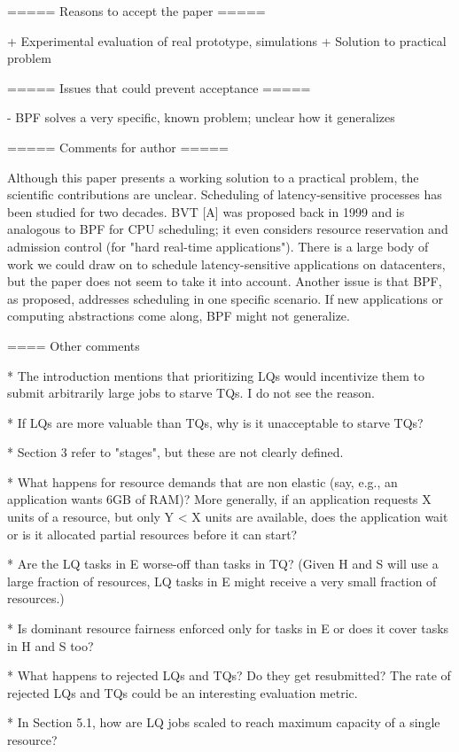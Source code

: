 ===== Reasons to accept the paper =====

+ Experimental evaluation of real prototype, simulations
+ Solution to practical problem

===== Issues that could prevent acceptance =====

- BPF solves a very specific, known problem; unclear how it generalizes

===== Comments for author =====

Although this paper presents a working solution to a practical
problem, the scientific contributions are unclear.  Scheduling of
latency-sensitive processes has been studied for two decades.  BVT
[A] was proposed back in 1999 and is analogous to BPF for CPU
scheduling; it even considers resource reservation and admission
control (for "hard real-time applications").  There is a large body
of work we could draw on to schedule latency-sensitive applications
on datacenters, but the paper does not seem to take it into account.
Another issue is that BPF, as proposed, addresses scheduling in one
specific scenario.  If new applications or computing abstractions
come along, BPF might not generalize.

==== Other comments

* The introduction mentions that prioritizing LQs would incentivize
them to submit arbitrarily large jobs to starve TQs.  I do not see
the reason.

* If LQs are more valuable than TQs, why is it unacceptable to
starve TQs?

* Section 3 refer to "stages", but these are not clearly defined.

* What happens for resource demands that are non elastic (say, e.g.,
an application wants 6GB of RAM)?  More generally, if an
application requests X units of a resource, but only Y < X units
are available, does the application wait or is it allocated
partial resources before it can start?

* Are the LQ tasks in E worse-off than tasks in TQ?  (Given H and
S will use a large fraction of resources, LQ tasks in E might
receive a very small fraction of resources.)

* Is dominant resource fairness enforced only for tasks in E or does
it cover tasks in H and S too?

* What happens to rejected LQs and TQs?  Do they get resubmitted?
The rate of rejected LQs and TQs could be an interesting
evaluation metric.

* In Section 5.1, how are LQ jobs scaled to reach maximum capacity
of a single resource?

